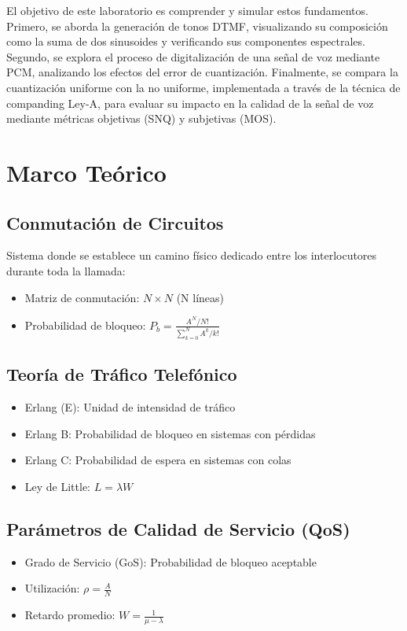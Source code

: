 \documentclass[journal]{IEEEtran} %
\begin{document}
El objetivo de este laboratorio es comprender y simular estos fundamentos. Primero, se aborda la generación de tonos DTMF, visualizando su composición como la suma de dos sinusoides y verificando sus componentes espectrales. Segundo, se explora el proceso de digitalización de una señal de voz mediante PCM, analizando los efectos del error de cuantización. Finalmente, se compara la cuantización uniforme con la no uniforme, implementada a través de la técnica de companding Ley-A, para evaluar su impacto en la calidad de la señal de voz mediante métricas objetivas (SNQ) y subjetivas (MOS).

\section{Marco Teórico}

\subsection{Conmutación de Circuitos}
Sistema donde se establece un camino físico dedicado entre los interlocutores durante toda la llamada:
\begin{itemize}
    \item Matriz de conmutación: $N \times N$ (N líneas)
    \item Probabilidad de bloqueo: $P_b = \frac{A^N/N!}{\sum_{k=0}^{N} A^k/k!}$
\end{itemize}

\subsection{Teoría de Tráfico Telefónico}
\begin{itemize}
    \item Erlang (E): Unidad de intensidad de tráfico
    \item Erlang B: Probabilidad de bloqueo en sistemas con pérdidas
    \item Erlang C: Probabilidad de espera en sistemas con colas
    \item Ley de Little: $L = \lambda W$
\end{itemize}

\subsection{Parámetros de Calidad de Servicio (QoS)}
\begin{itemize}
    \item Grado de Servicio (GoS): Probabilidad de bloqueo aceptable
    \item Utilización: $\rho = \frac{A}{N}$
    \item Retardo promedio: $W = \frac{1}{\mu - \lambda}$
\end{itemize}
\end{document}
